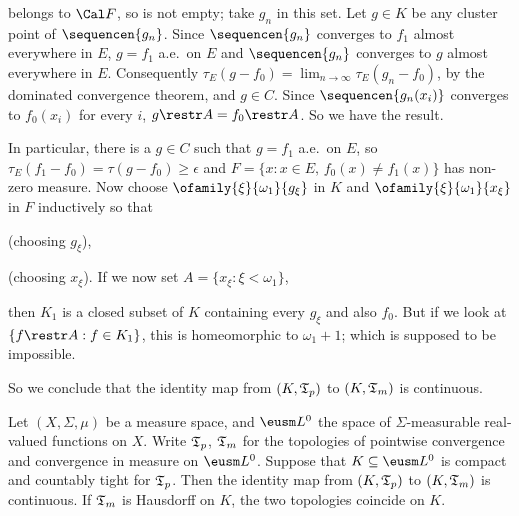 {\noindent belongs to $\Cal F$, so is not empty;  take $g_n$ in this set.
Let $g\in K$ be any cluster point of $\sequencen{g_n}$.    Since
$\sequencen{g_n}$ converges to $f_1$ almost everywhere in $E$, $g=f_1$
a.e.\ on $E$ and $\sequencen{g_n}$ converges to $g$ almost everywhere in
$E$.   Consequently $\tau_E(g-f_0)=\lim_{n\to\infty}\tau_E(g_n-f_0)$, by
the dominated convergence theorem, and $g\in C$.   
Since $\sequencen{g_n(x_i)}$
converges to $f_0(x_i)$ for every $i$, $g\restr A=f_0\restr A$.   So we
have the result.\ \Qed

In particular, there is a $g\in C$ such that $g=f_1$ a.e.\ on $E$, so
$\tau_E(f_1-f_0)=\tau(g-f_0)\ge\epsilon$ and
$F=\{x:x\in E,\,f_0(x)\ne f_1(x)\}$ has non-zero measure.   Now choose
$\ofamily{\xi}{\omega_1}{g_{\xi}}$ in $K$ and
$\ofamily{\xi}{\omega_1}{x_{\xi}}$ in $F$ inductively so that


\noindent (choosing $g_{\xi}$),


\noindent (choosing $x_{\xi}$).
If we now set $A=\{x_{\xi}:\xi<\omega_1\}$,


\noindent then $K_1$ is a closed subset of $K$ containing every
$g_{\xi}$ and also $f_0$.   But if we look at $\{f\restr A:f\in K_1\}$,
this is homeomorphic to $\omega_1+1$;   which is supposed to be
impossible.\ \Bang

So we conclude that the identity map from $(K,\frak T_p)$ to
$(K,\frak T_m)$ is continuous.
}%

 Let $(X,\Sigma,\mu)$ be a measure space, and
$\eusm L^0$ the space of $\Sigma$-measurable real-valued functions on
$X$.   Write $\frak T_p$, $\frak T_m$ for the topologies of pointwise
convergence and convergence in measure on $\eusm L^0$.   Suppose that
$K\subseteq\eusm L^0$ is compact
and countably tight for $\frak T_p$.   Then the identity map from
$(K,\frak T_p)$ to $(K,\frak T_m)$ is continuous.   If $\frak T_m$ is
Hausdorff on $K$, the two topologies coincide on $K$.


